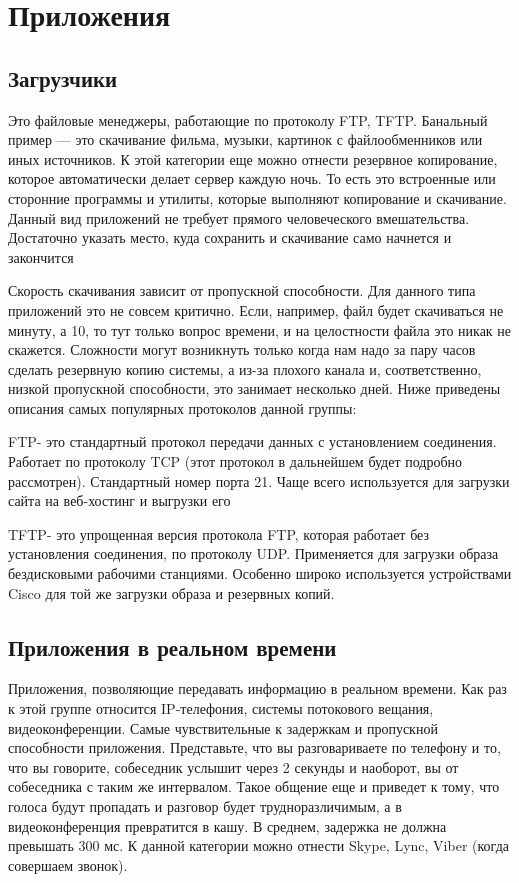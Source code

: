 \newpage
\section{Приложения}
\subsection{Загрузчики}

Это файловые менеджеры, работающие по протоколу FTP, TFTP. Банальный пример — это скачивание фильма, музыки, картинок с файлообменников
или иных источников. К этой категории еще можно отнести резервное копирование, которое автоматически делает сервер каждую ночь. То есть это встроенные или сторонние программы и утилиты, которые выполняют копирование и
скачивание. Данный вид приложений не требует прямого человеческого
вмешательства. Достаточно указать место, куда сохранить и скачивание само
начнется и закончится


Скорость скачивания зависит от пропускной способности. Для данного
типа приложений это не совсем критично. Если, например, файл будет скачиваться не минуту, а 10, то тут только вопрос времени, и на целостности файла
это никак не скажется. Сложности могут возникнуть только когда нам надо за
пару часов сделать резервную копию системы, а из-за плохого канала и, соответственно, низкой пропускной способности, это занимает несколько дней.
Ниже приведены описания самых популярных протоколов данной группы:


FTP- это стандартный протокол передачи данных с установлением соединения. Работает по протоколу TCP (этот протокол в дальнейшем будет подробно рассмотрен). Стандартный номер порта 21. Чаще всего используется для
загрузки сайта на веб-хостинг и выгрузки его


TFTP- это упрощенная версия протокола FTP, которая работает без
установления соединения, по протоколу UDP. Применяется для загрузки образа
бездисковыми рабочими станциями. Особенно широко используется
устройствами Cisco для той же загрузки образа и резервных копий.

\subsection{Приложения в реальном времени}

Приложения, позволяющие передавать информацию в реальном времени.
Как раз к этой группе относится IP-телефония, системы потокового вещания,
видеоконференции. Самые чувствительные к задержкам и пропускной способности приложения. Представьте, что вы разговариваете по телефону и то, что
вы говорите, собеседник услышит через 2 секунды и наоборот, вы от собеседника с таким же интервалом. Такое общение еще и приведет к тому, что голоса
будут пропадать и разговор будет трудноразличимым, а в видеоконференция
превратится в кашу. В среднем, задержка не должна превышать 300 мс. К данной категории можно отнести Skype, Lync, Viber (когда совершаем звонок).

